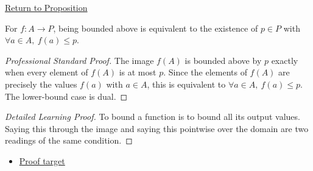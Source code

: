 \newpage
{}
\label{prf:boundedness-image-boundedness}

\begin{remark*}[Return]
\hyperref[prop:boundedness-image-boundedness]{Return to Proposition}
\end{remark*}

\begin{proposition*}
For $f:A\to P$, being bounded above is equivalent to the existence of
$p\in P$ with $\forall a\in A,\ f(a)\leq p$.
\end{proposition*}

\begin{proof}[Professional Standard Proof]
\LRAProofBodyStart
The image $f(A)$ is bounded above by $p$ exactly when every element of
$f(A)$ is at most $p$. Since the elements of $f(A)$ are precisely the values
$f(a)$ with $a\in A$, this is equivalent to
$\forall a\in A,\ f(a)\leq p$. The lower-bound case is dual.
\end{proof}

\begin{proof}[Detailed Learning Proof]
\LRAProofBodyStart
To bound a function is to bound all its output values. Saying this through the
image and saying this pointwise over the domain are two readings of the same
condition.
\end{proof}
\begin{remark*}
\end{remark*}



\begin{dependencies}
\begin{itemize}
  \item \hyperref[prop:boundedness-image-boundedness]{Proof target}
\end{itemize}
\end{dependencies}

\clearpage

